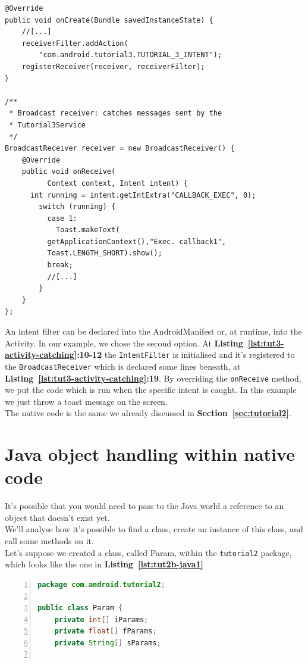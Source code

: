 \documentclass[a4paper,10pt]{article}
\newcommand{\keyword}[1]{\texttt{#1}}
\newcommand{\refl}[1]{\textbf{Listing~\ref{#1}}}
\newcommand{\refs}[1]{\textbf{Section~\ref{#1}}}
\begin{document}
\begin{multicols}{2}
\begin{lstlisting}
@Override
public void onCreate(Bundle savedInstanceState) {
	//[...]
	receiverFilter.addAction(
		"com.android.tutorial3.TUTORIAL_3_INTENT");
	registerReceiver(receiver, receiverFilter);
}

/**
 * Broadcast receiver: catches messages sent by the
 * Tutorial3Service
 */
BroadcastReceiver receiver = new BroadcastReceiver() {
	@Override
	public void onReceive(
          Context context, Intent intent) {
	  int running = intent.getIntExtra("CALLBACK_EXEC", 0);
	    switch (running) {
	      case 1:
	        Toast.makeText(
		  getApplicationContext(),"Exec. callback1",
		  Toast.LENGTH_SHORT).show();
	      break;
	      //[...]
	    }
	}
};
\end{lstlisting}
An intent filter can be declared into the AndroidManifest or, at runtime, into
the Activity. In our example, we chose the second option. At
\refl{lst:tut3-activity-catching}\textbf{:10-12} the \keyword{IntentFilter} is
initialised and it's registered to the \keyword{BroadcastReceiver} which is
declared some lines beneath, at \refl{lst:tut3-activity-catching}\textbf{:19}.
By overriding the \keyword{onReceive} method, we put the code which is run when
the specific intent is caught. In this example we just throw a toast message on
the screen.\\
The native code is the same we already discussed in \refs{sec:tutorial2}.


\section{Java object handling within native code}
It's possible that you would need to pass to the Java world a reference to an
object that doesn't exist yet.\\
We'll analyse how it's possible to find a class, create an instance of this
class, and call some methods on it.\\
Let's suppose we created a class, called Param, within the \keyword{tutorial2}
package, which looks like the one in \refl{lst:tut2b-java1}
\begin{lstlisting}[language=Java,
		   columns=fullflexible,
		   showstringspaces=false,
		   xleftmargin=15pt,
		   frame = l,
		   numbers=left,
		   commentstyle=\color{gray}\upshape,
		   caption=Java class Param,
		   label=lst:tut2b-java1]
package com.android.tutorial2;

public class Param {
	private int[] iParams;
	private float[] fParams;
	private String[] sParams;


\end{lstlisting}
\end{multicols}
\end{document}
